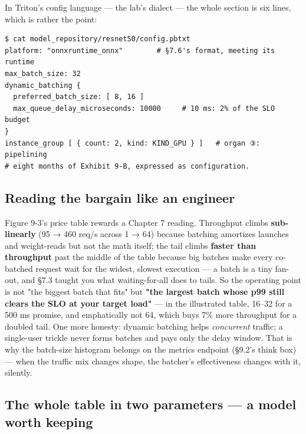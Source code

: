 In Triton's config language — the lab's dialect — the whole section is six lines, which is rather the point:

\begin{terminalbox}
\begin{Verbatim}[breaklines=true,breakanywhere=true,fontsize=\small,formatcom=\color{tbbtermfg},codes=\tbbcodeactive]
$ cat model_repository/resnet50/config.pbtxt
platform: "onnxruntime_onnx"        # §7.6's format, meeting its runtime
max_batch_size: 32
dynamic_batching {
  preferred_batch_size: [ 8, 16 ]
  max_queue_delay_microseconds: 10000     # 10 ms: 2% of the SLO budget
}
instance_group [ { count: 2, kind: KIND_GPU } ]   # organ ③: pipelining
# eight months of Exhibit 9-B, expressed as configuration.
\end{Verbatim}
\end{terminalbox}

\subsection*{Reading the bargain like an engineer}

Figure 9-3's price table rewards a Chapter 7 reading. Throughput climbs \textbf{sub-linearly} (95 → 460 req/s across 1 → 64) because batching amortizes launches and weight-reads but not the math itself; the tail climbs \textbf{faster than throughput} past the middle of the table because big batches make every co-batched request wait for the widest, slowest execution — a batch is a tiny fan-out, and §7.3 taught you what waiting-for-all does to tails. So the operating point is not "the biggest batch that fits" but \textbf{"the largest batch whose p99 still clears the SLO at your target load"} — in the illustrated table, 16–32 for a 500 ms promise, and emphatically not 64, which buys 7\% more throughput for a doubled tail. One more honesty: dynamic batching helps \textit{concurrent} traffic; a single-user trickle never forms batches and pays only the delay window. That is why the batch-size histogram belongs on the metrics endpoint (§9.2's think box) — when the traffic mix changes shape, the batcher's effectiveness changes with it, silently.

\subsection*{The whole table in two parameters — a model worth keeping}

